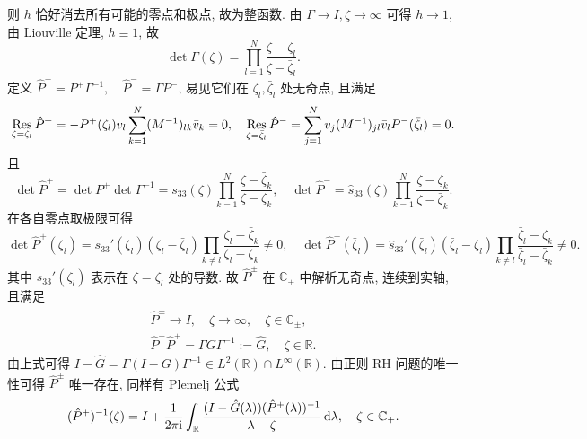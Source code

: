 则 $h$ 恰好消去所有可能的零点和极点, 故为整函数. 由 $\Gamma \to I, \zeta \to \infty$ 可得 $h \to 1$, 由 Liouville 定理, $h \equiv 1$, 故
\begin{equation}
    \det \Gamma(\zeta) = \prod_{l=1}^{N} \frac{\zeta - \zeta_{l}}{\zeta - \bar{\zeta}_{l}}.
\end{equation}
定义 $\hat{P}^{+} = P^{+} \Gamma^{-1}, \quad \hat{P}^{-} = \Gamma P^{-}$, 易见它们在 $\zeta_{l}, \bar{\zeta}_{l}$ 处无奇点, 且满足
\begin{equation}
    \operatorname*{Res}_{\zeta = \zeta_{l}}\hat{P}^{+} = -P^{+}(\zeta_{l})v_{l} \sum_{k = 1}^{N}(M^{-1})_{lk}\bar{v}_{k} = 0, \quad
    \operatorname*{Res}_{\zeta = \bar{\zeta}_{l}}\hat{P}^{-} = \sum_{j = 1}^{N}v_{j}(M^{-1})_{jl}\bar{v}_{l} P^{-}(\bar{\zeta}_{l}) = 0.
\end{equation}
且
\begin{equation}
    \det\hat{P}^{+} = \det P^{+} \det \Gamma^{-1} = s_{33}(\zeta) \prod_{k = 1}^{N} \frac{\zeta - \bar{\zeta}_{k}}{\zeta - \zeta_{k}},  \quad
    \det\hat{P}^{-} = \hat{s}_{33}(\zeta) \prod_{k = 1}^{N} \frac{\zeta - \zeta_{k}}{\zeta - \bar{\zeta}_{k}}.
\end{equation}
在各自零点取极限可得
\begin{equation}
    \det \hat{P}^{+}(\zeta_{l}) = s_{33}'(\zeta_{l}) (\zeta_{l} - \bar{\zeta}_{l}) \prod_{k \neq l} \frac{\zeta_{l} - \bar{\zeta}_{k}}{\zeta_{l} - \zeta_{k}} \neq 0, \quad
    \det \hat{P}^{-}(\bar{\zeta}_{l}) = \hat{s}_{33}'(\bar{\zeta}_{l}) (\bar{\zeta}_{l} - \zeta_{l}) \prod_{k \neq l} \frac{\bar{\zeta}_{l} - \zeta_{k}}{\bar{\zeta}_{l} - \bar{\zeta}_{k}} \neq 0.
\end{equation}
其中 $s_{33}'(\zeta_{l})$ 表示在 $\zeta = \zeta_{l}$ 处的导数. 故 $\hat{P}^{\pm}$ 在 $\mathbb{C}_{\pm}$ 中解析无奇点, 连续到实轴, 且满足
\begin{equation}
    \begin{aligned}
        \hat{P}^{\pm} \to I, \quad \zeta \to \infty, \quad \zeta \in \mathbb{C}_{\pm}, \\
        \hat{P}^{-} \hat{P}^{+} = \Gamma G \Gamma^{-1} := \hat{G}, \quad \zeta \in \mathbb{R}.
    \end{aligned}
\end{equation}
由上式可得 $I - \hat{G} = \Gamma (I - G) \Gamma^{-1} \in L^{2}(\mathbb{R}) \cap L^{\infty}(\mathbb{R})$. 由正则 RH 问题的唯一性可得 $\hat{P}^{\pm}$ 唯一存在, 同样有 Plemelj 公式
\begin{equation}
    (\hat{P}^{+})^{-1}(\zeta) = I + \frac{1}{2 \pi \mathrm{i}} \int_{\mathbb{R}} \frac{(I - \hat{G}(\lambda)) (\hat{P}^{+}(\lambda))^{-1}}{\lambda - \zeta} \mathop{}\!\mathrm{d} \lambda, \quad \zeta \in \mathbb{C}_{+}.
\end{equation}
